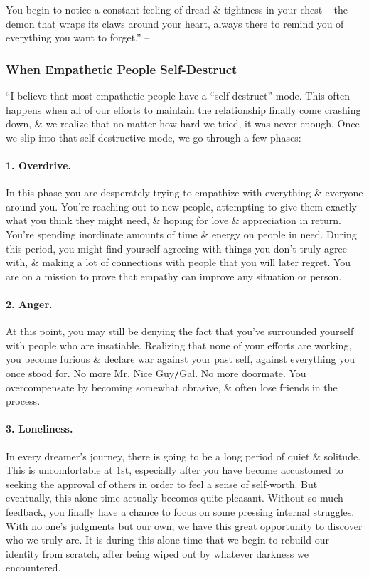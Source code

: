 \documentclass{article}
\numberwithin{equation}{section}
\begin{document}
You begin to notice a constant feeling of dread \& tightness in your chest -- the demon that wraps its claws around your heart, always there to remind you of everything you want to forget.'' -- \cite[p. 124]{MacKenzie2015}

\subsubsection{When Empathetic People Self-Destruct}
``I believe that most empathetic people have a ``self-destruct'' mode. This often happens when all of our efforts to maintain the relationship finally come crashing down, \& we realize that no matter how hard we tried, it was never enough. Once we slip into that self-destructive mode, we go through a few phases:

\paragraph{1. Overdrive.} In this phase you are desperately trying to empathize with everything \& everyone around you. You're reaching out to new people, attempting to give them exactly what you think they might need, \& hoping for love \& appreciation in return. You're spending inordinate amounts of time \& energy on people in need. During this period, you might find yourself agreeing with things you don't truly agree with, \& making a lot of connections with people that you will later regret. You are on a mission to prove that empathy can improve any situation or person.

\paragraph{2. Anger.} At this point, you may still be denying the fact that you've surrounded yourself with people who are insatiable. Realizing that none of your efforts are working, you become furious \& declare war against your past self, against everything you once stood for. No more Mr. Nice Guy\texttt{/}Gal. No more doormate. You overcompensate by becoming somewhat abrasive, \& often lose friends in the process.

\paragraph{3. Loneliness.} In every dreamer's journey, there is going to be a long period of quiet \& solitude. This is uncomfortable at 1st, especially after you have become accustomed to seeking the approval of others in order to feel a sense of self-worth. But eventually, this alone time actually becomes quite pleasant. Without so much feedback, you finally have a chance to focus on some pressing internal struggles. With no one's judgments but our own, we have this great opportunity to discover who we truly are. It is during this alone time that we begin to rebuild our identity from scratch, after being wiped out by whatever darkness we encountered.
\end{document}
